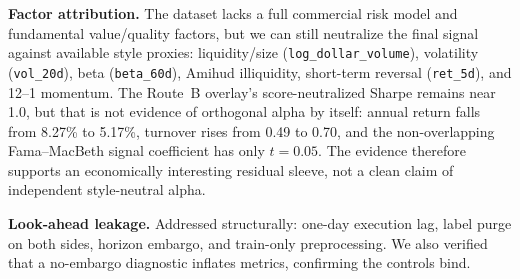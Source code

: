 \documentclass[9pt]{extarticle}
\begin{document}
\textbf{Factor attribution.} The dataset lacks a full commercial risk model and
fundamental value/quality factors, but we can still neutralize the final signal
against available style proxies: liquidity/size
(\texttt{log\_dollar\_volume}), volatility (\texttt{vol\_20d}), beta
(\texttt{beta\_60d}), Amihud illiquidity, short-term reversal
(\texttt{ret\_5d}), and 12--1 momentum. The Route~B overlay's score-neutralized
Sharpe remains near 1.0, but that is not evidence of orthogonal alpha by itself:
annual return falls from 8.27\% to 5.17\%, turnover rises from 0.49 to 0.70, and
the non-overlapping Fama--MacBeth signal coefficient has only $t=0.05$. The
evidence therefore supports an economically interesting residual sleeve, not a
clean claim of independent style-neutral alpha.

\textbf{Look-ahead leakage.} Addressed structurally: one-day execution lag,
label purge on both sides, horizon embargo, and train-only preprocessing. We
also verified that a no-embargo diagnostic inflates metrics, confirming the
controls bind.
\end{document}
